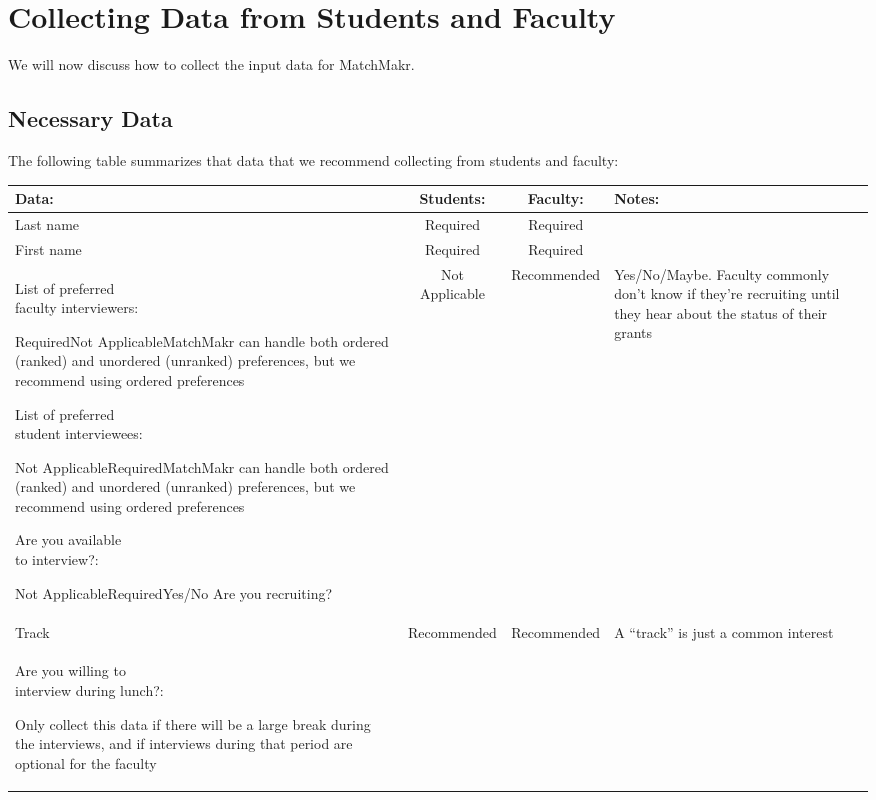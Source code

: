 \newcommand{\tabline}[4]{#1 & #2 & #3 & #4\\ \hline}
\newcommand{\tabheader}[4]{\hline \textbf{#1} & \textbf{#2} & \textbf{#3} & \textbf{#4}\\ \hline \hline}
\newcommand{\cwidth}{1in}
\newcommand{\notrecommended}{\parbox[t]{\cwidth}{\centering{Not \\Recommended}}}
\newcommand{\pb}[1]{\parbox[t]{1.5in}{#1: \\}}

\chapter{Collecting Data from Students and Faculty}

We will now discuss how to collect the input data for MatchMakr.

\section{Necessary Data}
The following table summarizes that data that we recommend collecting from students and faculty:

\begin{center}
	\begin{tabular}{| l | c | c | p{2in}| }
		\tabheader{Data:}{Students:}{Faculty:}{Notes:}
		\tabline{Last name}{Required}{Required}{}
		\tabline{First name}{Required}{Required}{}
		\tabline{\pb{List of preferred \\ faculty interviewers}}{Required}{Not Applicable}{MatchMakr can handle both ordered (ranked) and unordered (unranked) preferences, but we recommend using ordered preferences}
		\tabline{\pb{List of preferred \\ student interviewees}}{Not Applicable}{Required}{MatchMakr can handle both ordered (ranked) and unordered (unranked) preferences, but we recommend using ordered preferences}
		\tabline{\pb{Are you available \\ to interview?}}{Not Applicable}{Required}{Yes/No}
		\tabline{Are you recruiting?}{Not Applicable}{Recommended}{Yes/No/Maybe.  Faculty commonly don't know if they're recruiting until they hear about the status of their grants}
		\tabline{Track}{Recommended}{Recommended}{A ``track'' is just a common interest}
		\tabline{\pb{Are you willing to \\interview during lunch?}}{\notrecommended}{\notrecommended}{Only collect this data if there will be a large break during the interviews, and if interviews during that period are optional for the faculty}
	\end{tabular}
\end{center}

